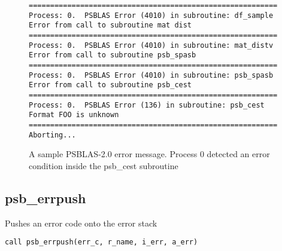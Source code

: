 \begin{figure}[h!]
  \begin{Sbox}
    \begin{minipage}[tl]{0.95\textwidth}
\begin{verbatim}
==========================================================
Process: 0.  PSBLAS Error (4010) in subroutine: df_sample           
Error from call to subroutine mat dist            
==========================================================
Process: 0.  PSBLAS Error (4010) in subroutine: mat_distv           
Error from call to subroutine psb_spasb           
==========================================================
Process: 0.  PSBLAS Error (4010) in subroutine: psb_spasb           
Error from call to subroutine psb_cest            
==========================================================
Process: 0.  PSBLAS Error (136) in subroutine: psb_cest            
Format FOO is unknown
==========================================================
Aborting...
\end{verbatim}
    \end{minipage}
  \end{Sbox}
  \setlength{\fboxsep}{8pt}
  \begin{center}
    \fbox{\TheSbox}
  \end{center}
  \caption{\label{fig:errormsg}A sample PSBLAS-2.0 error
    message. Process 0 detected an error condition inside the {\textrm
    psb\_cest} subroutine}
\end{figure}


\clearpage\subsection{psb\_errpush}{Pushes an error code onto the error
  stack}


\begin{lstlisting}
call psb_errpush(err_c, r_name, i_err, a_err)
\end{lstlisting}


